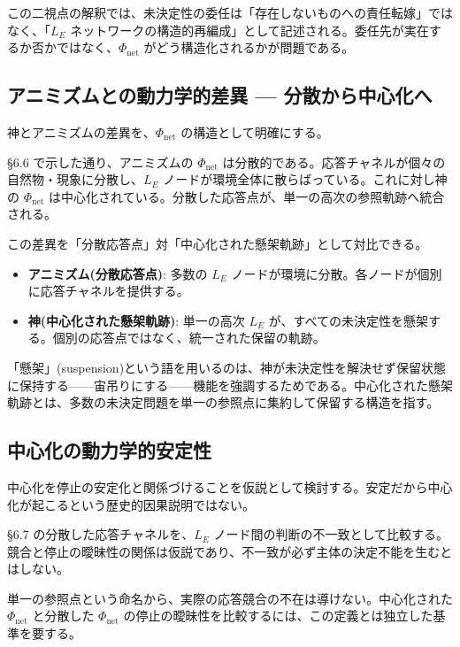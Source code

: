 この二視点の解釈では、未決定性の委任は「存在しないものへの責任転嫁」ではなく、「$L_E$ ネットワークの構造的再編成」として記述される。委任先が実在するか否かではなく、$\Phi_{\text{net}}$ がどう構造化されるかが問題である。

\bigskip


\subsection{アニミズムとの動力学的差異 — 分散から中心化へ}


神とアニミズムの差異を、$\Phi_{\text{net}}$ の構造として明確にする。

\S{}6.6 で示した通り、アニミズムの $\Phi_{\text{net}}$ は分散的である。応答チャネルが個々の自然物・現象に分散し、$L_E$ ノードが環境全体に散らばっている。これに対し神の $\Phi_{\text{net}}$ は中心化されている。分散した応答点が、単一の高次の参照軌跡へ統合される。

この差異を「分散応答点」対「中心化された懸架軌跡」として対比できる。

\begin{itemize}
\item \textbf{アニミズム(分散応答点)}: 多数の $L_E$ ノードが環境に分散。各ノードが個別に応答チャネルを提供する。
\item \textbf{神(中心化された懸架軌跡)}: 単一の高次 $L_E$ が、すべての未決定性を懸架する。個別の応答点ではなく、統一された保留の軌跡。
\end{itemize}


「懸架」(suspension)という語を用いるのは、神が未決定性を解決せず保留状態に保持する——宙吊りにする——機能を強調するためである。中心化された懸架軌跡とは、多数の未決定問題を単一の参照点に集約して保留する構造を指す。

\bigskip


\subsection{中心化の動力学的安定性}


中心化を停止の安定化と関係づけることを仮説として検討する。安定だから中心化が起こるという歴史的因果説明ではない。

\S{}6.7 の分散した応答チャネルを、$L_E$ ノード間の判断の不一致として比較する。競合と停止の曖昧性の関係は仮説であり、不一致が必ず主体の決定不能を生むとはしない。

単一の参照点という命名から、実際の応答競合の不在は導けない。中心化された $\Phi_{\text{net}}$ と分散した $\Phi_{\text{net}}$ の停止の曖昧性を比較するには、この定義とは独立した基準を要する。

